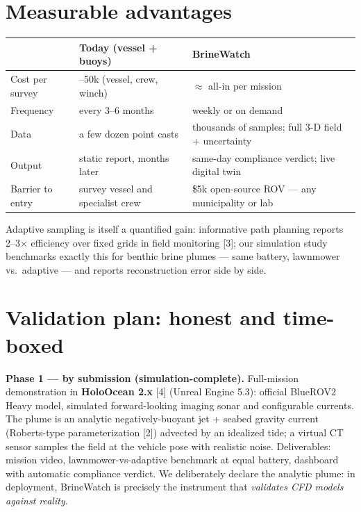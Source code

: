 \documentclass[10pt,a4paper]{article}
\newcommand{\keyword}[1]{\textbf{\color{deepblue}#1}}
\begin{document}
\section{Measurable advantages}
\begin{center}\small
\begin{tabular}{@{}p{3.0cm}p{6.0cm}p{7.0cm}@{}}
\toprule
 & \textbf{Today (vessel + buoys)} & \textbf{BrineWatch} \\
\midrule
Cost per survey   & \texteuro20--50k (vessel, crew, winch) & ${\approx}$\texteuro500 all-in per mission \\
Frequency         & every 3--6 months & weekly or on demand \\
Data              & a few dozen point casts & thousands of samples; full 3-D field $+$ uncertainty \\
Output            & static report, months later & same-day compliance verdict; live digital twin \\
Barrier to entry  & survey vessel and specialist crew & \$5k open-source ROV --- any municipality or lab \\
\bottomrule
\end{tabular}
\end{center}
Adaptive sampling is itself a quantified gain: informative path planning reports 2--3$\times$ efficiency over fixed grids in field monitoring [3]; our simulation study benchmarks exactly this for benthic brine plumes --- same battery, lawnmower vs.\ adaptive --- and reports reconstruction error side by side.

\section{Validation plan: honest and time-boxed}
\textbf{Phase 1 --- by submission (simulation-complete).} Full-mission demonstration in \keyword{HoloOcean 2.x} [4] (Unreal Engine 5.3): official BlueROV2 Heavy model, simulated forward-looking imaging sonar and configurable currents. The plume is an analytic negatively-buoyant jet + seabed gravity current (Roberts-type parameterization [2]) advected by an idealized tide; a virtual CT sensor samples the field at the vehicle pose with realistic noise. Deliverables: mission video, lawnmower-vs-adaptive benchmark at equal battery, dashboard with automatic compliance verdict. We deliberately declare the analytic plume: in deployment, BrineWatch is precisely the instrument that \emph{validates CFD models against reality}.
\end{document}
